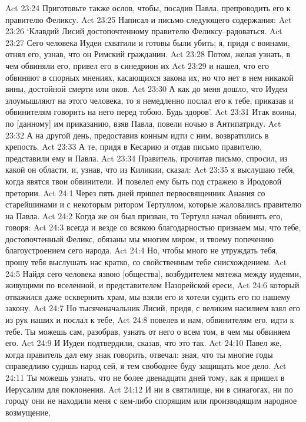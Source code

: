 Act 23:24  Приготовьте также ослов, чтобы, посадив Павла, препроводить его к правителю Феликсу.
Act 23:25  Написал и письмо следующего содержания:
Act 23:26  `Клавдий Лисий достопочтенному правителю Феликсу--радоваться.
Act 23:27  Сего человека Иудеи схватили и готовы были убить; я, придя с воинами, отнял его, узнав, что он Римский гражданин.
Act 23:28  Потом, желая узнать, в чем обвиняли его, привел его в синедрион их
Act 23:29  и нашел, что его обвиняют в спорных мнениях, касающихся закона их, но что нет в нем никакой вины, достойной смерти или оков.
Act 23:30  А как до меня дошло, что Иудеи злоумышляют на этого человека, то я немедленно послал его к тебе, приказав и обвинителям говорить на него перед тобою. Будь здоров'.
Act 23:31  Итак воины, по [данному] им приказанию, взяв Павла, повели ночью в Антипатриду.
Act 23:32  А на другой день, предоставив конным идти с ним, возвратились в крепость.
Act 23:33  А те, придя в Кесарию и отдав письмо правителю, представили ему и Павла.
Act 23:34  Правитель, прочитав письмо, спросил, из какой он области, и, узнав, что из Киликии, сказал:
Act 23:35  я выслушаю тебя, когда явятся твои обвинители. И повелел ему быть под стражею в Иродовой претории.
Act 24:1  Через пять дней пришел первосвященник Анания со старейшинами и с некоторым ритором Тертуллом, которые жаловались правителю на Павла.
Act 24:2  Когда же он был призван, то Тертулл начал обвинять его, говоря:
Act 24:3  всегда и везде со всякою благодарностью признаем мы, что тебе, достопочтенный Феликс, обязаны мы многим миром, и твоему попечению благоустроением сего народа.
Act 24:4  Но, чтобы много не утруждать тебя, прошу тебя выслушать нас кратко, со свойственным тебе снисхождением.
Act 24:5  Найдя сего человека язвою [общества], возбудителем мятежа между иудеями, живущими по вселенной, и представителем Назорейской ереси,
Act 24:6  который отважился даже осквернить храм, мы взяли его и хотели судить его по нашему закону.
Act 24:7  Но тысяченачальник Лисий, придя, с великим насилием взял его из рук наших и послал к тебе,
Act 24:8  повелев и нам, обвинителям его, идти к тебе. Ты можешь сам, разобрав, узнать от него о всем том, в чем мы обвиняем его.
Act 24:9  И Иудеи подтвердили, сказав, что это так.
Act 24:10  Павел же, когда правитель дал ему знак говорить, отвечал: зная, что ты многие годы справедливо судишь народ сей, я тем свободнее буду защищать мое дело.
Act 24:11  Ты можешь узнать, что не более двенадцати дней тому, как я пришел в Иерусалим для поклонения.
Act 24:12  И ни в святилище, ни в синагогах, ни по городу они не находили меня с кем-либо спорящим или производящим народное возмущение,
